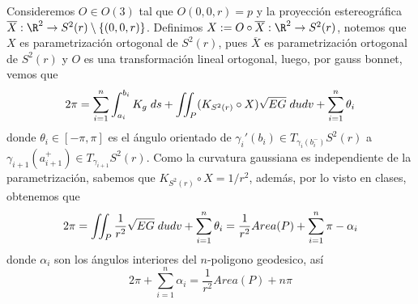 \documentclass{article}
\begin{document}
\vspace{2mm}
\noindent Consideremos $O\in O(3)$ tal que $O(0,0,r)=p$ y la proyección estereográfica 
$\overline{X}:\R^{2}\to S^{2}(r)\setminus\{(0,0,r)\}$. Definimos 
$X:=O\circ\overline{X}:\R^{2}\to S^{2}(r)$, notemos que $X$ es parametrización ortogonal de 
$S^{2}(r)$, pues $\overline{X}$ es parametrización ortogonal de $S^{2}(r)$ y $O$ es una 
transformación lineal ortogonal, luego, por gauss bonnet, vemos que
\begin{align*}
    2\pi=\sum_{i=1}^{n}\int_{a_{i}}^{b_{i}}K_{g}\hspace{1mm}ds
    +\iint_{P}(K_{S^{2}(r)}\circ X)\sqrt{EG}\hspace{1mm}dudv+\sum_{i=1}^{n}\theta_{i}
\end{align*}
donde $\theta_{i}\in[-\pi,\pi]$ es el ángulo orientado de $\gamma_{i}'(b_{i})\in 
T_{\gamma_{i}(b_{i}^{-})}S^{2}(r)$ a $\gamma_{i+1}(a_{i+1}^{+})\in T_{\gamma_{i+1}}S^{2}(r)$. Como
la curvatura gaussiana es independiente de la parametrización, sabemos que $K_{S^{2}(r)}\circ X
=1/r^{2}$, además, por lo visto en clases, obtenemos que
\begin{equation*}
    2\pi=\iint_{P}\frac{1}{r^{2}}\sqrt{EG}\hspace{1mm}dudv+\sum_{i=1}^{n}\theta_{i}
    =\frac{1}{r^{2}}Area(P)+\sum_{i=1}^{n}\pi-\alpha_{i}
\end{equation*}
donde $\alpha_{i}$ son los ángulos interiores del $n$-poligono geodesico, así
\begin{equation*}
    2\pi+\sum_{i=1}^{n}\alpha_{i}=\frac{1}{r^{2}}Area(P)+n\pi
\end{equation*}
 
\end{document}
